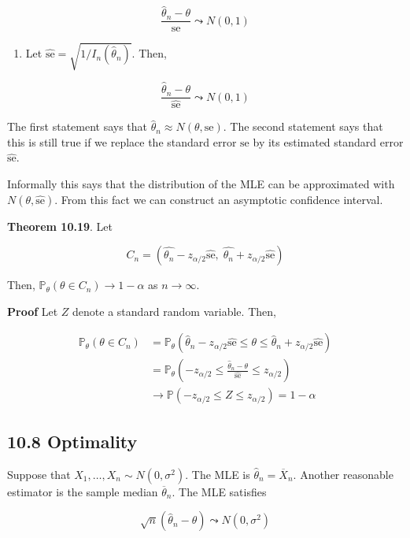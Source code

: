 \[ \frac{\hat{\theta}_{n} - \theta}{\text{se}} \leadsto N(0, 1) \]

\begin{enumerate}[tightlist,label={\arabic*.}]
\item
  Let \(\hat{\text{se}} = \sqrt{1 / I_{n}(\hat{\theta}_{n})}\). Then,
\end{enumerate}

\[ \frac{\hat{\theta}_{n} - \theta}{\hat{\text{se}}} \leadsto N(0, 1) \]

The first statement says that
\(\hat{\theta}_{n} \approx N(\theta, \text{se})\). The second statement
says that this is still true if we replace the standard error
\(\text{se}\) by its estimated standard error \(\hat{\text{se}}\).

Informally this says that the distribution of the MLE can be
approximated with \(N(\theta, \hat{\text{se}})\). From this fact we can
construct an asymptotic confidence interval.

\textbf{Theorem 10.19}. Let

\[ C_{n} = \left( \hat{\theta_{n}} - z_{\alpha/2} \hat{\text{se}}, \; \hat{\theta_{n}} + z_{\alpha/2} \hat{\text{se}} \right) \]

Then, \(\mathbb{P}_\theta(\theta \in C_{n}) \rightarrow 1 - \alpha\) as
\(n \rightarrow \infty\).

\textbf{Proof} Let \(Z\) denote a standard random variable. Then,

\begin{align*}
\mathbb{P}_\theta(\theta \in C_{n}) 
&= \mathbb{P}_\theta(\hat{\theta}_{n} - z_{\alpha/2} \hat{\text{se}} \leq \theta \leq \hat{\theta}_{n} + z_{\alpha/2} \hat{\text{se}}) \\
&= \mathbb{P}_\theta(-z_{\alpha/2} \leq \frac{\hat{\theta}_{n} - \theta}{\hat{\text{se}}} \leq z_{\alpha/2}) \\
&\rightarrow \mathbb{P}(-z_{\alpha/2} \leq Z \leq z_{\alpha/2}) = 1 - \alpha
\end{align*}

\subsection*{10.8 Optimality}\label{optimality}

Suppose that \(X_{1}, \dots, X_{n} \sim N(0, \sigma^{2})\). The MLE is
\(\hat{\theta}_{n} = \overline{X}_{n}\). Another reasonable estimator is the
sample median \(\overline{\theta}_{n}\). The MLE satisfies

\[ \sqrt{n}(\hat{\theta}_{n} - \theta) \leadsto N(0, \sigma^{2}) \]

